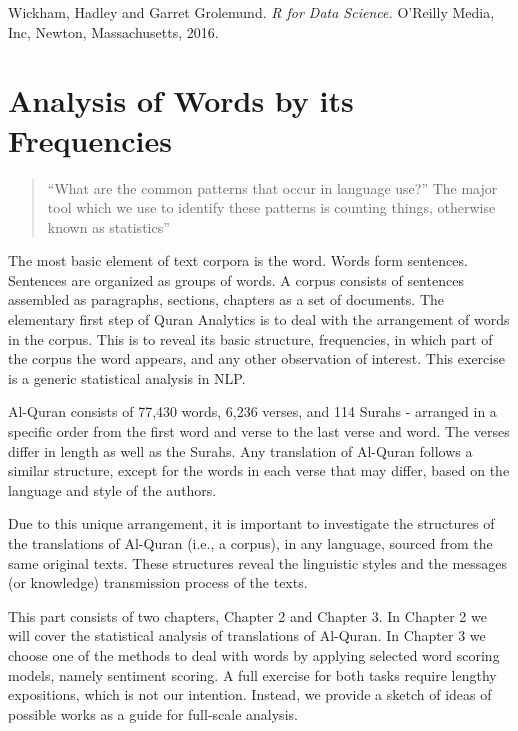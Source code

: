\documentclass[
]{article}
\begin{document}
Wickham, Hadley and Garret Grolemund. \emph{R for Data Science.} O'Reilly Media, Inc, Newton, Massachusetts, 2016. \citep{wickham2016}

\hypertarget{analysis-of-words-by-its-frequencies}{%
\section*{Analysis of Words by its Frequencies}\label{analysis-of-words-by-its-frequencies}}

\begin{quote}
``What are the common patterns that occur in language use?'' The major tool which we use to identify these patterns is counting things, otherwise known as statistics'' \citep[pg. 4]{manning1999}
\end{quote}

The most basic element of text corpora is the word. Words form sentences. Sentences are organized as groups of words. A corpus consists of sentences assembled as paragraphs, sections, chapters as a set of documents. The elementary first step of Quran Analytics is to deal with the arrangement of words in the corpus. This is to reveal its basic structure, frequencies, in which part of the corpus the word appears, and any other observation of interest. This exercise is a generic statistical analysis in NLP.

Al-Quran consists of 77,430 words, 6,236 verses, and 114 Surahs - arranged in a specific order from the first word and verse to the last verse and word. The verses differ in length as well as the Surahs. Any translation of Al-Quran follows a similar structure, except for the words in each verse that may differ, based on the language and style of the authors.

Due to this unique arrangement, it is important to investigate the structures of the translations of Al-Quran (i.e., a corpus), in any language, sourced from the same original texts. These structures reveal the linguistic styles and the messages (or knowledge) transmission process of the texts.

This part consists of two chapters, Chapter 2 and Chapter 3. In Chapter 2 we will cover the statistical analysis of translations of Al-Quran. In Chapter 3 we choose one of the methods to deal with words by applying selected word scoring models, namely sentiment scoring. A full exercise for both tasks require lengthy expositions, which is not our intention. Instead, we provide a sketch of ideas of possible works as a guide for full-scale analysis.
\end{document}
